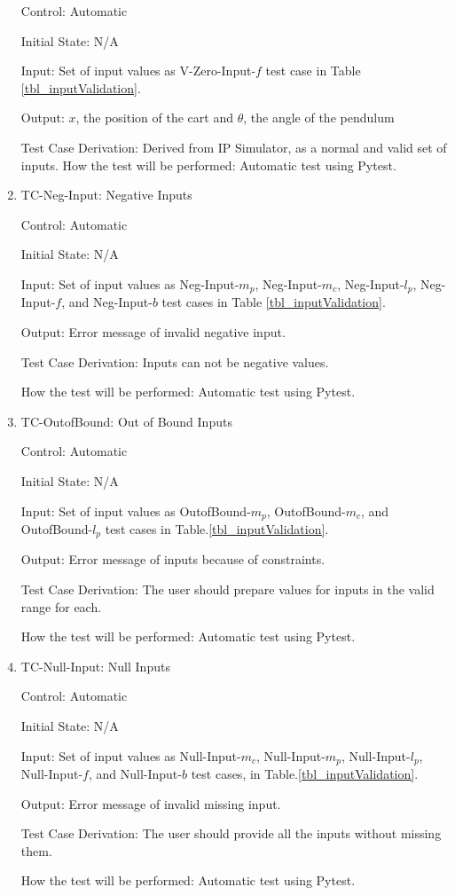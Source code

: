 \documentclass[12pt, titlepage]{article}
\begin{document}
\begin{enumerate}
Control: Automatic
					
Initial State: N/A 
					
Input: Set of input values as V-Zero-Input-$f$ test case in Table \ref{tbl_inputValidation}.
					
Output: $x$, the position of the cart and $\theta$, the angle of the pendulum

Test Case Derivation: Derived from IP Simulator, as a normal and valid set of inputs.			
How the test will be performed: Automatic test using Pytest.

\item{TC-Neg-Input: Negative Inputs}

Control: Automatic
					
Initial State: N/A 
					
Input: Set of input values as Neg-Input-$m_p$, Neg-Input-$m_c$, Neg-Input-$l_p$, Neg-Input-$f$, and Neg-Input-$b$ test cases in Table \ref{tbl_inputValidation}.
					
Output: Error message of invalid negative input.

Test Case Derivation: Inputs can not be negative values.
					
How the test will be performed: Automatic test using Pytest.

\item{TC-OutofBound: Out of Bound Inputs}

Control: Automatic
					
Initial State: N/A 
					
Input: Set of input values as OutofBound-$m_p$, OutofBound-$m_c$, and OutofBound-$l_p$ test cases in Table.\ref{tbl_inputValidation}.
					
Output: Error message of inputs because of constraints.

Test Case Derivation: The user should prepare values for inputs in the valid range for each.

How the test will be performed: Automatic test using Pytest.

\item{TC-Null-Input: Null Inputs}

Control: Automatic
					
Initial State: N/A 
					
Input: Set of input values as Null-Input-$m_c$, Null-Input-$m_p$, Null-Input-$l_p$, Null-Input-$f$, and Null-Input-$b$ test cases, in Table.\ref{tbl_inputValidation}.
					
Output: Error message of invalid missing input.

Test Case Derivation: The user should provide all the inputs without missing them.
					
					
How the test will be performed: Automatic test using Pytest.			
				
\end{enumerate}
\end{document}
